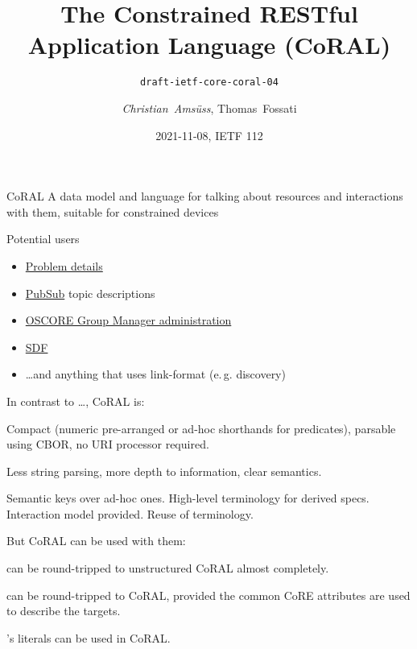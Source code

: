 \documentclass[aspectratio=169,colorlinks]{beamer}
\title[CoRAL]{The Constrained RESTful Application Language (CoRAL)}
\subtitle{\texttt{draft-ietf-core-coral-04}}
\author{\textit{Christian~Amsüss}, Thomas~Fossati}
\date{2021-11-08, IETF 112}
\begin{document}
\frame{\titlepage}

\begin{frame}{CoRAL}\Large
	A data model and language for talking about resources and interactions with them,
	suitable for constrained devices
\end{frame}

\begin{frame}{Potential users}\Large
	\begin{itemize}
		\item \href{https://datatracker.ietf.org/doc/draft-ietf-core-problem-details/}{Problem details}
		\item \href{https://datatracker.ietf.org/doc/draft-ietf-core-coap-pubsub/}{PubSub} topic descriptions
		\item \href{https://datatracker.ietf.org/doc/draft-ietf-ace-oscore-gm-admin/}{OSCORE Group Manager administration}
		\item \href{https://datatracker.ietf.org/wg/asdf/documents/}{SDF}
		\item \ldots and anything that uses link-format (e.\,g. discovery)
	\end{itemize}
\end{frame}

\begin{frame}{In contrast to \ldots, CoRAL is:}\Large
	\begin{description}
		\setlength\itemsep{1em}
		\item[RDF] Compact (numeric pre-arranged or ad-hoc shorthands for predicates), parsable using CBOR, no URI processor required.

		\item[RFC6690] Less string parsing, more depth to information, clear semantics.

		\item[CBOR] Semantic keys over ad-hoc ones. High-level terminology for derived specs. Interaction model provided. Reuse of terminology.
	\end{description}
\end{frame}

\begin{frame}{But CoRAL can be used with them:}\Large
	\begin{description}
		\setlength\itemsep{1em}
		\item[RDF] can be round-tripped to unstructured CoRAL almost completely.

		\item[RFC6690] can be round-tripped to CoRAL, provided the common CoRE attributes are used to describe the targets.

		\item[CBOR]\hspace{-0.3em}'s literals can be used in CoRAL.
	\end{description}
\end{frame}
\end{document}
